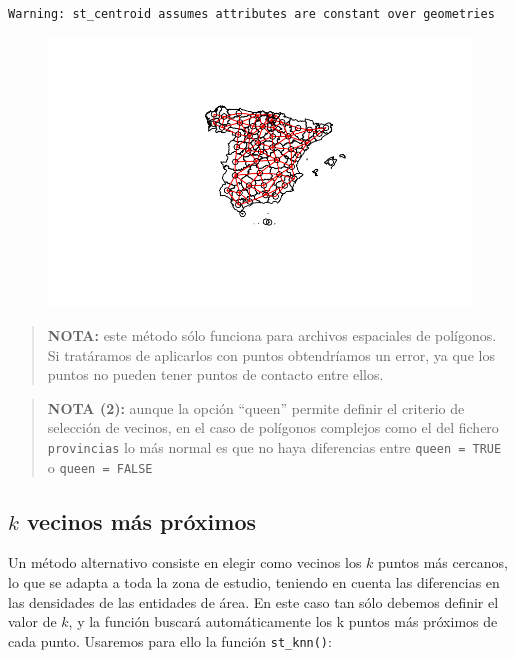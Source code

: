 \documentclass[
  letterpaper,
  DIV=11,
  numbers=noendperiod]{scrreprt}
\begin{document}
\begin{verbatim}
Warning: st_centroid assumes attributes are constant over geometries
\end{verbatim}

\begin{figure}[H]

{\centering \includegraphics{04_AutocorrelacionEspacial_files/figure-pdf/unnamed-chunk-3-1.pdf}

}

\end{figure}

\begin{quote}
\textbf{NOTA:} este método sólo funciona para archivos espaciales de
polígonos. Si tratáramos de aplicarlos con puntos obtendríamos un error,
ya que los puntos no pueden tener puntos de contacto entre ellos.
\end{quote}

\begin{quote}
\textbf{NOTA (2):} aunque la opción ``queen'' permite definir el
criterio de selección de vecinos, en el caso de polígonos complejos como
el del fichero \texttt{provincias} lo más normal es que no haya
diferencias entre \texttt{queen\ =\ TRUE} o \texttt{queen\ =\ FALSE}
\end{quote}

\hypertarget{k-vecinos-muxe1s-pruxf3ximos}{%
\subsection{\texorpdfstring{\(k\) vecinos más
próximos}{k vecinos más próximos}}\label{k-vecinos-muxe1s-pruxf3ximos}}

Un método alternativo consiste en elegir como vecinos los \(k\) puntos
más cercanos, lo que se adapta a toda la zona de estudio, teniendo en
cuenta las diferencias en las densidades de las entidades de área. En
este caso tan sólo debemos definir el valor de \(k\), y la función
buscará automáticamente los k puntos más próximos de cada punto.
Usaremos para ello la función \texttt{st\_knn()}:
\end{document}
